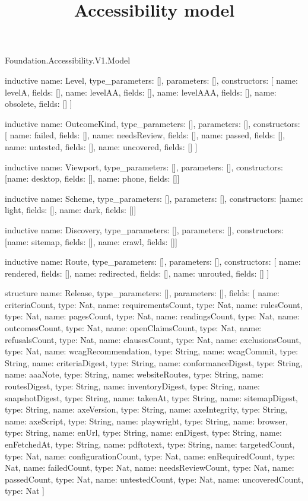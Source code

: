 \begin{lexlean}{Foundation.Accessibility.V1.Model}
\title{Accessibility model}
\begin{semanticmodule}
inductive{
  name: Level,
  type_parameters: [],
  parameters: [],
  constructors: [
    {name: levelA, fields: []},
    {name: levelAA, fields: []},
    {name: levelAAA, fields: []},
    {name: obsolete, fields: []}
  ]
}

inductive{
  name: OutcomeKind,
  type_parameters: [],
  parameters: [],
  constructors: [
    {name: failed, fields: []},
    {name: needsReview, fields: []},
    {name: passed, fields: []},
    {name: untested, fields: []},
    {name: uncovered, fields: []}
  ]
}

inductive{
  name: Viewport,
  type_parameters: [],
  parameters: [],
  constructors: [{name: desktop, fields: []}, {name: phone, fields: []}]
}

inductive{
  name: Scheme,
  type_parameters: [],
  parameters: [],
  constructors: [{name: light, fields: []}, {name: dark, fields: []}]
}

inductive{
  name: Discovery,
  type_parameters: [],
  parameters: [],
  constructors: [{name: sitemap, fields: []}, {name: crawl, fields: []}]
}

inductive{
  name: Route,
  type_parameters: [],
  parameters: [],
  constructors: [
    {name: rendered, fields: []},
    {name: redirected, fields: []},
    {name: unrouted, fields: []}
  ]
}

structure{
  name: Release,
  type_parameters: [],
  parameters: [],
  fields: [
    {name: criteriaCount, type: Nat},
    {name: requirementsCount, type: Nat},
    {name: rulesCount, type: Nat},
    {name: pagesCount, type: Nat},
    {name: readingsCount, type: Nat},
    {name: outcomesCount, type: Nat},
    {name: openClaimsCount, type: Nat},
    {name: refusalsCount, type: Nat},
    {name: clausesCount, type: Nat},
    {name: exclusionsCount, type: Nat},
    {name: wcagRecommendation, type: String},
    {name: wcagCommit, type: String},
    {name: criteriaDigest, type: String},
    {name: conformanceDigest, type: String},
    {name: aaaNote, type: String},
    {name: websiteRoutes, type: String},
    {name: routesDigest, type: String},
    {name: inventoryDigest, type: String},
    {name: snapshotDigest, type: String},
    {name: takenAt, type: String},
    {name: sitemapDigest, type: String},
    {name: axeVersion, type: String},
    {name: axeIntegrity, type: String},
    {name: axeScript, type: String},
    {name: playwright, type: String},
    {name: browser, type: String},
    {name: enUrl, type: String},
    {name: enDigest, type: String},
    {name: enFetchedAt, type: String},
    {name: pdftotext, type: String},
    {name: targetedCount, type: Nat},
    {name: configurationCount, type: Nat},
    {name: enRequiredCount, type: Nat},
    {name: failedCount, type: Nat},
    {name: needsReviewCount, type: Nat},
    {name: passedCount, type: Nat},
    {name: untestedCount, type: Nat},
    {name: uncoveredCount, type: Nat}
  ]
}


\end{semanticmodule}
\end{lexlean}

